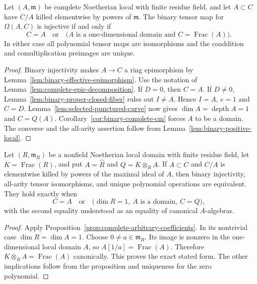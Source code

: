 \begin{proposition}
\label{prop:complete-arbitrary-coefficients}
Let $(A,\mathfrak m)$ be complete Noetherian local with finite
residue field, and let $A\subset C$ have $C/A$ killed elementwise
by powers of $\mathfrak m$.  The binary tensor map for
$\Omega(A,C)$ is injective if and only if
\[
 C=A\quad\text{or}\quad
 \bigl(A\text{ is a one-dimensional domain and }
                   C=\operatorname{Frac}(A)\bigr).
\]
In either case all polynomial tensor maps are isomorphisms and
the coaddition and comultiplication preimages are unique.
\end{proposition}
\begin{proof}
Binary injectivity makes $A\to C$ a ring epimorphism by
Lemma~\ref{lem:binary-effective-epimorphism}.
Use the notation of Lemma~\ref{lem:complete-epic-decomposition}.
If $D=0$, then $C=A$.
If $D\ne0$, Lemma~\ref{lem:binary-proper-closed-fiber}
rules out $I\ne A$.  Hence $I=A$, $e=1$ and $C=D$.
Lemma~\ref{lem:selected-punctured-curve} now gives
$\dim A=\operatorname{depth}A=1$ and $C=Q(A)$.
Corollary~\ref{cor:binary-complete-cm} forces $A$ to be a domain.
The converse and the all-arity assertion follow from
Lemma~\ref{lem:binary-positive-local}.
\end{proof}

\begin{corollary}
\label{cor:binary-completed-domain}
Let $(R,\mathfrak m_R)$ be a nonfield Noetherian local domain
with finite residue field, let $K=\operatorname{Frac}(R)$, and
put $A=\widehat R$ and $Q=K\otimes_R A$.
If $A\subset C$ and $C/A$ is elementwise killed by powers of
the maximal ideal of $A$, then binary injectivity, all-arity
tensor isomorphisms, and unique polynomial operations are
equivalent.  They hold exactly when
\[
 C=A\quad\text{or}\quad
 \bigl(\dim R=1,\ A\text{ is a domain},\ C=Q\bigr),
\]
with the second equality understood as an equality of
canonical $A$-algebras.
\end{corollary}
\begin{proof}
Apply Proposition~\ref{prop:complete-arbitrary-coefficients}.
In its nontrivial case $\dim R=\dim A=1$.
Choose $0\ne a\in\mathfrak m_R$.
Its image is nonzero in the one-dimensional local domain $A$,
so $A[1/a]=\operatorname{Frac}(A)$.
Therefore $K\otimes_R A=\operatorname{Frac}(A)$ canonically.
This proves the exact stated form.  The other implications
follow from the proposition and uniqueness for the zero
polynomial.
\end{proof}

